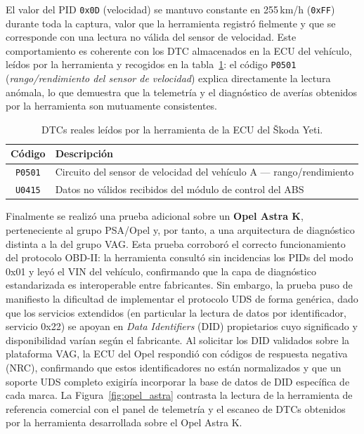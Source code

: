 El valor del PID \texttt{0x0D} (velocidad) se mantuvo constante en 255\,km/h (\texttt{0xFF}) durante toda la captura, valor que la herramienta registró fielmente y que se corresponde con una lectura no válida del sensor de velocidad. Este comportamiento es coherente con los DTC almacenados en la ECU del vehículo, leídos por la herramienta y recogidos en la tabla~\ref{tab:skoda_dtcs}: el código \texttt{P0501} (\textit{rango/rendimiento del sensor de velocidad}) explica directamente la lectura anómala, lo que demuestra que la telemetría y el diagnóstico de averías obtenidos por la herramienta son mutuamente consistentes.

\begin{table}[!htbp]
\caption{DTCs reales leídos por la herramienta de la ECU del Škoda Yeti.}
\label{tab:skoda_dtcs}
\centering
\renewcommand{\arraystretch}{1.2}
\begin{tabular}{|c|l|}
\hline
\textbf{Código} & \textbf{Descripción} \\
\hline
\texttt{P0501} & Circuito del sensor de velocidad del vehículo A — rango/rendimiento \\
\texttt{U0415} & Datos no válidos recibidos del módulo de control del ABS \\
\hline
\end{tabular}
\end{table}

Finalmente se realizó una prueba adicional sobre un \textbf{Opel Astra K}, perteneciente al grupo PSA/Opel y, por tanto, a una arquitectura de diagnóstico distinta a la del grupo VAG. Esta prueba corroboró el correcto funcionamiento del protocolo OBD-II: la herramienta consultó sin incidencias los PIDs del modo 0x01 y leyó el VIN del vehículo, confirmando que la capa de diagnóstico estandarizada es interoperable entre fabricantes. Sin embargo, la prueba puso de manifiesto la dificultad de implementar el protocolo UDS de forma genérica, dado que los servicios extendidos (en particular la lectura de datos por identificador, servicio 0x22) se apoyan en \textit{Data Identifiers} (DID) propietarios cuyo significado y disponibilidad varían según el fabricante. Al solicitar los DID validados sobre la plataforma VAG, la ECU del Opel respondió con códigos de respuesta negativa (NRC), confirmando que estos identificadores no están normalizados y que un soporte UDS completo exigiría incorporar la base de datos de DID específica de cada marca. La Figura~\ref{fig:opel_astra} contrasta la lectura de la herramienta de referencia comercial con el panel de telemetría y el escaneo de DTCs obtenidos por la herramienta desarrollada sobre el Opel Astra K.

